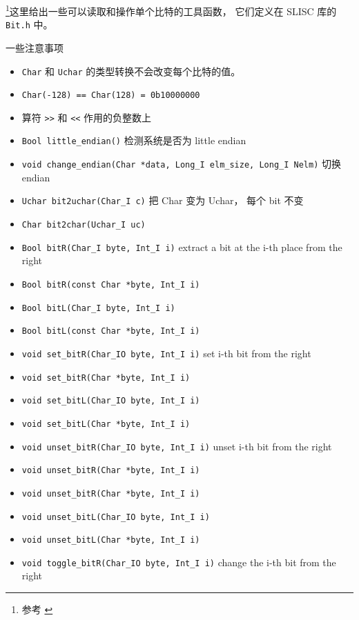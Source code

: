 
\footnote{参考 \cite{NR3}}这里给出一些可以读取和操作单个比特的工具函数， 它们定义在 SLISC 库的 \verb|Bit.h| 中。

一些注意事项
\begin{itemize}
\item \verb|Char| 和 \verb|Uchar| 的类型转换不会改变每个比特的值。
\item \verb|Char(-128) == Char(128) = 0b10000000|
\item 算符 \verb|>>| 和 \verb|<<| 作用的负整数上
\end{itemize}

\begin{itemize}
\item \verb|Bool little_endian()| 检测系统是否为 little endian
\item \verb|void change_endian(Char *data, Long_I elm_size, Long_I Nelm)| 切换 endian
\item \verb|Uchar bit2uchar(Char_I c)| 把 Char 变为 Uchar， 每个 bit 不变
\item \verb|Char bit2char(Uchar_I uc)|
\item \verb|Bool bitR(Char_I byte, Int_I i)| extract a bit at the i-th place from the right
\item \verb|Bool bitR(const Char *byte, Int_I i)|
\item \verb|Bool bitL(Char_I byte, Int_I i)|
\item \verb|Bool bitL(const Char *byte, Int_I i)|
\item \verb|void set_bitR(Char_IO byte, Int_I i)| set i-th bit from the right
\item \verb|void set_bitR(Char *byte, Int_I i)|
\item \verb|void set_bitL(Char_IO byte, Int_I i)|
\item \verb|void set_bitL(Char *byte, Int_I i)|
\item \verb|void unset_bitR(Char_IO byte, Int_I i)| unset i-th bit from the right
\item \verb|void unset_bitR(Char *byte, Int_I i)|
\item \verb|void unset_bitR(Char *byte, Int_I i)|
\item \verb|void unset_bitL(Char_IO byte, Int_I i)|
\item \verb|void unset_bitL(Char *byte, Int_I i)|
\item \verb|void toggle_bitR(Char_IO byte, Int_I i)| change the i-th bit from the right

\end{itemize}

